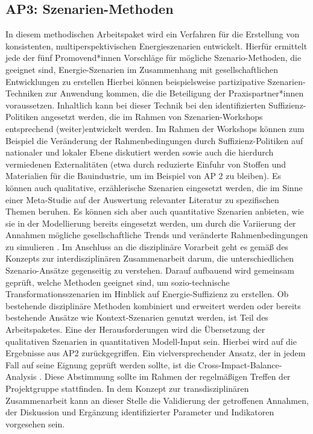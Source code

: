 \documentclass[a4paper,11pt,twoside]{scrartcl}
\begin{document}
\subsection*{AP3: Szenarien-Methoden}
In diesem methodischen Arbeitspaket wird ein Verfahren für die Erstellung von konsistenten, multiperspektivischen Energieszenarien entwickelt. Hierfür ermittelt jede der fünf Promovend*innen Vorschläge für mögliche Szenario-Methoden, die geeignet sind, Energie-Szenarien im Zusammenhang mit gesellschaftlichen Entwicklungen zu erstellen %
Hierbei können beispielsweise partizipative Szenarien-Techniken zur Anwendung kommen, die die Beteiligung der Praxispartner*innen voraussetzen. 
Inhaltlich kann bei dieser Technik bei den identifizierten Suffizienz-Politiken angesetzt werden, die im Rahmen von Szenarien-Workshops entsprechend (weiter)entwickelt werden. Im Rahmen der Workshops können zum Beispiel die Veränderung der Rahmenbedingungen durch Suffizienz-Politiken auf nationaler und lokaler Ebene diskutiert werden sowie auch die hierdurch vermiedenen Externalitäten (etwa durch reduzierte Einfuhr von Stoffen und Materialien für die Bauindustrie, um im Beispiel von AP 2 zu bleiben). Es können auch qualitative, erzählerische Szenarien eingesetzt werden, die im Sinne einer Meta-Studie auf der Auswertung relevanter Literatur zu spezifischen Themen beruhen. Es können sich aber auch quantitative Szenarien anbieten, wie sie in der Modellierung bereits eingesetzt werden, um  durch die Variierung der Annahmen mögliche gesellschaftliche Trends und veränderte Rahmenbedingungen zu simulieren \cite{Bierwirth2016}. 
Im Anschluss an die disziplinäre Vorarbeit geht es gemäß des Konzepts zur interdisziplinären Zusammenarbeit darum, die unterschiedlichen Szenario-Ansätze gegenseitig zu verstehen. Darauf aufbauend wird gemeinsam geprüft, welche Methoden geeignet sind, um sozio-technische Transformationsszenarien im Hinblick auf Energie-Suffizienz zu erstellen. Ob bestehende disziplinäre Methoden kombiniert und erweitert werden oder bereits bestehende Ansätze wie Kontext-Szenarien genutzt werden, ist Teil des Arbeitspaketes. Eine der Herausforderungen wird die Übersetzung der qualitativen Szenarien in quantitativen Modell-Input sein. Hierbei wird auf die Ergebnisse aus AP2 zurückgegriffen. Ein vielversprechender Ansatz, der in jedem Fall auf seine Eignung geprüft werden sollte, ist die Cross-Impact-Balance-Analysis \cite{WEIMERJEHLE2016}. Diese Abstimmung sollte im Rahmen der regelmäßigen Treffen der Projektgruppe stattfinden.
In dem Konzept zur transdisziplinären Zusammenarbeit kann an dieser Stelle die Validierung der getroffenen Annahmen, der Diskussion und Ergänzung identifizierter Parameter und Indikatoren vorgesehen sein.
\end{document}
